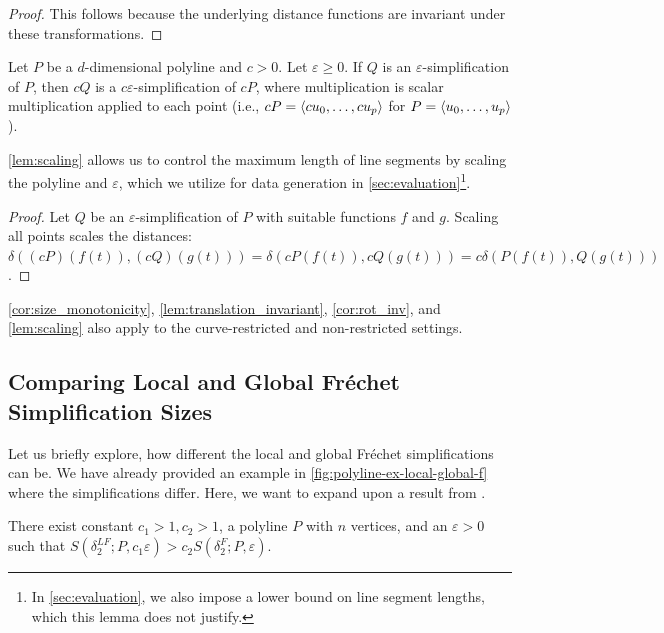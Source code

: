 \begin{proof}
	This follows because the underlying distance functions are invariant under these transformations.
\end{proof}

\begin{lemma}\label{lem:scaling}
	Let \(P\) be a \(d\)-dimensional polyline and \(c > 0\). Let \(\varepsilon \geq 0\). If \(Q\) is an \(\varepsilon\)-simplification of \(P\), then \(cQ\) is a \(c\varepsilon\)-simplification of \(cP\), where multiplication is scalar multiplication applied to each point (i.e., \(cP = \left\langle cu_0, \dots, cu_p\right\rangle\) for \(P = \left\langle u_0,\dots, u_p\right\rangle\)).
\end{lemma}

\cref{lem:scaling} allows us to control the maximum length of line segments by scaling the polyline and \(\varepsilon\), which we utilize for data generation in \cref{sec:evaluation}\footnote{In \cref{sec:evaluation}, we also impose a lower bound on line segment lengths, which this lemma does not justify.}.

\begin{proof}
	Let \(Q\) be an \(\varepsilon\)-simplification of \(P\) with suitable functions \(f\) and \(g\). Scaling all points scales the distances: \(\delta((cP)(f(t)), (cQ)(g(t))) = \delta(cP(f(t)), cQ(g(t))) = c\delta(P(f(t)), Q(g(t)))\).
\end{proof}

\begin{remark}
	\cref{cor:size_monotonicity}, \cref{lem:translation_invariant}, \cref{cor:rot_inv}, and \cref{lem:scaling} also apply to the curve-restricted and non-restricted settings.
\end{remark}

\subsection{Comparing Local and Global Fréchet Simplification Sizes}
Let us briefly explore, how different the local and global Fréchet simplifications can be. We have already provided an example in \cref{fig:polyline-ex-local-global-f} where the simplifications differ. Here, we want to expand upon a result from \citeauthor{on_optimal_polyline_simplification_using_the_hausdorff_and_frechet_distance}. 

\begin{theorem}
	There exist constant \(c_1 > 1, c_2 > 1\), a polyline \(P\) with \(n\) vertices, and an \(\varepsilon > 0\) such that \(S(\delta^{LF}_2; P, c_1 \varepsilon) > c_2 S(\delta^F_2; P, \varepsilon)\).
\end{theorem}

